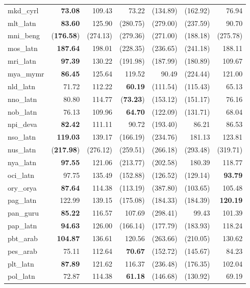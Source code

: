 \documentclass[11pt]{article}
\begin{document}
\begin{center}
\begin{longtable}[width=0.9\textwidth]{|l|rrrrrr|}
mkd\_cyrl & \textbf{73.08} & 109.43 & 73.22 & (134.89) & (162.92) & 76.94 \\ 
mlt\_latn & \textbf{83.60} & 125.90 & (280.75) & (279.00) & (237.59) & 90.70 \\ 
mni\_beng & (\textbf{176.58}) & (274.13) & (279.36) & (271.00) & (188.18) & (275.78) \\ 
mos\_latn & \textbf{187.64} & 198.01 & (228.35) & (236.65) & (241.18) & 188.11 \\ 
mri\_latn & \textbf{97.39} & 130.22 & (191.98) & (187.99) & (180.89) & 109.67 \\ 
mya\_mymr & \textbf{86.45} & 125.64 & 119.52 & 90.49 & (224.44) & 121.00 \\ 
nld\_latn & 71.72 & 112.22 & \textbf{60.19} & (111.54) & (115.43) & 65.13 \\ 
nno\_latn & 80.80 & 114.77 & (\textbf{73.23}) & (153.12) & (151.17) & 76.16 \\ 
nob\_latn & 76.13 & 109.96 & \textbf{64.70} & (122.09) & (131.71) & 68.04 \\ 
npi\_deva & \textbf{82.42} & 111.11 & 90.72 & (193.40) & 86.21 & 86.53 \\ 
nso\_latn & \textbf{119.03} & 139.17 & (166.19) & (234.76) & 181.13 & 123.81 \\ 
nus\_latn & (\textbf{217.98}) & (276.12) & (259.51) & (266.18) & (293.48) & (319.71) \\ 
nya\_latn & \textbf{97.55} & 121.06 & (213.77) & (202.58) & 180.39 & 118.77 \\ 
oci\_latn & 97.75 & 135.49 & (152.88) & (126.52) & (129.14) & \textbf{93.79} \\ 
ory\_orya & \textbf{87.64} & 114.38 & (113.19) & (387.80) & (103.65) & 105.48 \\ 
pag\_latn & 122.99 & 139.15 & (175.08) & (184.33) & (184.39) & \textbf{120.19} \\ 
pan\_guru & \textbf{85.22} & 116.57 & 107.69 & (298.41) & 99.43 & 101.39 \\ 
pap\_latn & \textbf{94.63} & 126.00 & (166.14) & (177.79) & (183.93) & 118.24 \\ 
pbt\_arab & \textbf{104.87} & 136.61 & 120.56 & (263.66) & (210.05) & 130.62 \\ 
pes\_arab & 75.11 & 112.64 & \textbf{70.67} & (152.72) & (145.67) & 84.23 \\ 
plt\_latn & \textbf{87.89} & 121.62 & 116.37 & (236.48) & (176.35) & 102.04 \\ 
pol\_latn & 72.87 & 114.38 & \textbf{61.18} & (146.68) & (130.92) & 69.19 \\ 

\end{longtable}
\end{center}
\end{document}
